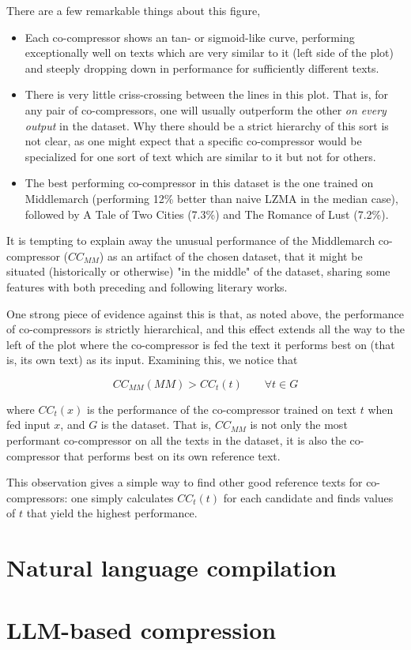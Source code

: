 There are a few remarkable things about this figure,

\begin{itemize}
    \item Each co-compressor shows an tan- or sigmoid-like curve, performing exceptionally well on texts which are very similar to it (left side of the plot) and steeply dropping down in performance for sufficiently different texts.
    \item There is very little criss-crossing between the lines in this plot. That is, for any pair of co-compressors, one will usually outperform the other \emph{on every output} in the dataset. Why there should be a strict hierarchy of this sort is not clear, as one might expect that a specific co-compressor would be specialized for one sort of text which are similar to it but not for others.
    \item The best performing co-compressor in this dataset is the one trained on Middlemarch (performing 12\% better than naive LZMA in the median case), followed by A Tale of Two Cities (7.3\%) and The Romance of Lust (7.2\%).
\end{itemize}

It is tempting to explain away the unusual performance of the Middlemarch co-compressor ($CC_{MM}$) as an artifact of the chosen dataset, that it might be situated (historically or otherwise) "in the middle" of the dataset, sharing some features with both preceding and following literary works.

One strong piece of evidence against this is that, as noted above, the performance of co-compressors is strictly hierarchical, and this effect extends all the way to the left of the plot where the co-compressor is fed the text it performs best on (that is, its own text) as its input. Examining this, we notice that

$$CC_{MM}(MM) > CC_t(t) \qquad \forall t \in G$$

where $CC_t(x)$ is the performance of the co-compressor trained on text $t$ when fed input $x$, and $G$ is the dataset. That is, $CC_{MM}$ is not only the most performant co-compressor on all the texts in the dataset, it is also the co-compressor that performs best on its own reference text.

This observation gives a simple way to find other good reference texts for co-compressors: one simply calculates $CC_t(t)$ for each candidate and finds values of $t$ that yield the highest performance.

\section{Natural language compilation}

\section{LLM-based compression}